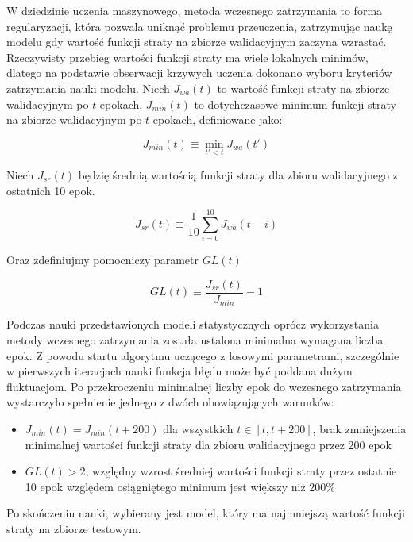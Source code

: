 \documentclass[11pt]{book}
\theoremstyle{definition}
\begin{document}
W dziedzinie uczenia maszynowego, metoda wczesnego zatrzymania to forma regularyzacji, która pozwala uniknąć problemu przeuczenia, zatrzymując naukę modelu gdy wartość funkcji straty na zbiorze walidacyjnym zaczyna wzrastać. Rzeczywisty przebieg wartości funkcji straty ma wiele lokalnych minimów, dlatego na podstawie obserwacji krzywych uczenia dokonano wyboru kryteriów zatrzymania nauki modelu. 
Niech $J_{wa}(t)$ to wartość funkcji straty na zbiorze walidacyjnym po $t$ epokach, $J_{min}(t)$ to dotychczasowe minimum funkcji straty na zbiorze walidacyjnym po $t$ epokach, definiowane jako:

\begin{equation}
J_{min}(t) \equiv \min_{t' < t} J_{wa}(t')
\end{equation}


Niech $J_{sr}(t)$ będzię średnią wartością funkcji straty dla zbioru walidacyjnego z ostatnich 10 epok.

\begin{equation}
J_{sr}(t) \equiv \frac{1}{10} \sum_{i=0}^{10} J_{wa}(t-i)
\end{equation}

Oraz zdefiniujmy pomocniczy parametr $GL(t)$

\begin{equation}
GL(t) \equiv \frac{J_{sr}(t)}{J_{min}} - 1
\end{equation}

Podczas nauki przedstawionych modeli statystycznych oprócz wykorzystania metody wczesnego zatrzymania została ustalona minimalna wymagana liczba epok. Z powodu startu algorytmu uczącego z losowymi parametrami, szczególnie w pierwszych iteracjach nauki funkcja błędu może być poddana dużym fluktuacjom. Po przekroczeniu minimalnej liczby epok do wczesnego zatrzymania wystarczyło spełnienie jednego z dwóch obowiązujących warunków:

\begin{itemize}
	\item $J_{min}(t) = J_{min}(t+ 200)$ dla wszystkich $t \in [t,t+200]$, brak zmniejszenia minimalnej wartości funkcji straty dla zbioru walidacyjnego przez 200 epok 
	\item $ GL(t)  > 2$, względny wzrost średniej wartości funkcji straty przez ostatnie 10 epok względem osiągniętego minimum jest większy niż $200\%$
\end{itemize}

Po skończeniu nauki, wybierany jest model, który ma najmniejszą wartość funkcji straty na zbiorze testowym.
\end{document}
